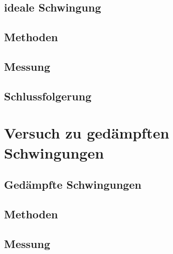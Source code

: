\documentclass[11pt,a4paper,titlepage, ngerman]{article}
\begin{document}
			
			\subsection*{ideale Schwingung}
				
				
			\subsection*{Methoden}
				
			
			\subsection*{Messung}
			
				
			\subsection*{Schlussfolgerung}
			
					
		\section{Versuch zu gedämpften Schwingungen}
			
			
			\subsection*{Gedämpfte Schwingungen}
				
				
			\subsection*{Methoden}
				
			
			\subsection*{Messung}
			
\end{document}
